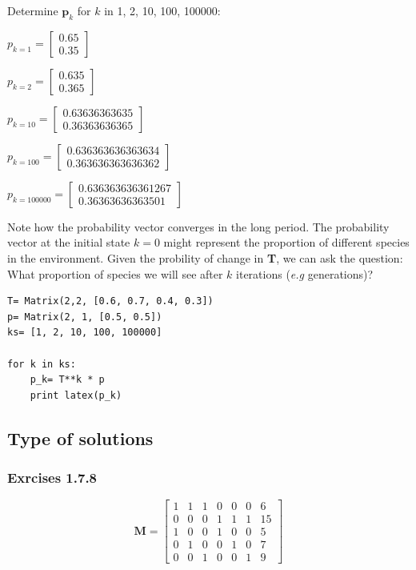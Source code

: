 Determine $\mathbf{p}_k$ for $k$ in 1, 2, 10, 100, 100000:

$p_{k= 1} = \left[\begin{matrix}0.65\\0.35\end{matrix}\right]$

$p_{k= 2} = \left[\begin{matrix}0.635\\0.365\end{matrix}\right]$

$p_{k= 10} = \left[\begin{matrix}0.63636363635\\0.36363636365\end{matrix}\right]$

$p_{k= 100} = \left[\begin{matrix}0.636363636363634\\0.363636363636362\end{matrix}\right]$

$p_{k= 100000} = \left[\begin{matrix}0.636363636361267\\0.36363636363501\end{matrix}\right]$

Note how the probability vector converges in the long period. The probability vector
at the initial state $k = 0$ might represent the proportion of different species
in the environment. Given the probility of change in \textbf{T}, we can ask the question:
What proportion of species we will see after $k$ iterations (\textit{e.g} generations)?

\begin{verbatim}
T= Matrix(2,2, [0.6, 0.7, 0.4, 0.3])
p= Matrix(2, 1, [0.5, 0.5])
ks= [1, 2, 10, 100, 100000]

for k in ks:
    p_k= T**k * p
    print latex(p_k)
\end{verbatim}


\subsection{Type of solutions}

\subsubsection{Exrcises 1.7.8}

\begin{equation}\label{eq:}
\textbf{M} = \left[\begin{matrix}1 & 1 & 1 & 0 & 0 & 0 & 6\\0 & 0 & 0 & 1 & 1 & 1 & 15\\1 & 0 & 0 & 1 & 0 & 0 & 5\\0 & 1 & 0 & 0 & 1 & 0 & 7\\0 & 0 & 1 & 0 & 0 & 1 & 9\end{matrix}\right]
\end{equation}

